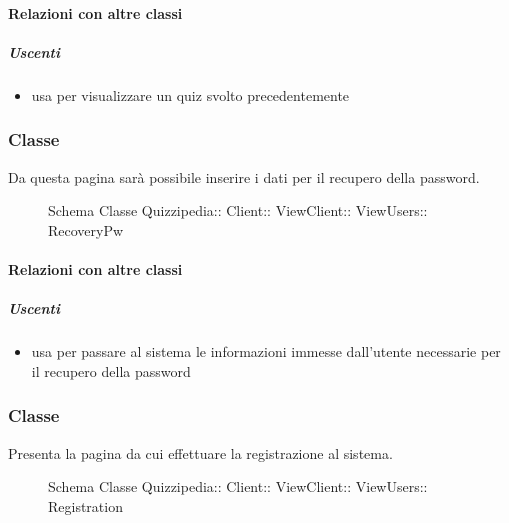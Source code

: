 \paragraph{Relazioni con altre classi}
\subparagraph{Uscenti}
\begin{itemize}
\item usa  per visualizzare un quiz svolto precedentemente
\end{itemize}
\subsubsection{Classe }
Da questa pagina sarà possibile inserire i dati per il recupero della password.
\begin{figure}[H]
\centering
\noindent{}
\caption[Schema Classe RecoveryPw]{Schema Classe Quizzipedia:: Client:: ViewClient:: ViewUsers:: RecoveryPw}
\end{figure}
\paragraph{Relazioni con altre classi}
\subparagraph{Uscenti}
\begin{itemize}
\item usa  per passare al sistema le informazioni immesse dall'utente necessarie per il recupero della password
\end{itemize}
\subsubsection{Classe }
Presenta la pagina da cui effettuare la  registrazione al sistema.
\begin{figure}[H]
\centering
\noindent{}
\caption[Schema Classe Registration]{Schema Classe Quizzipedia:: Client:: ViewClient:: ViewUsers:: Registration}
\end{figure}
